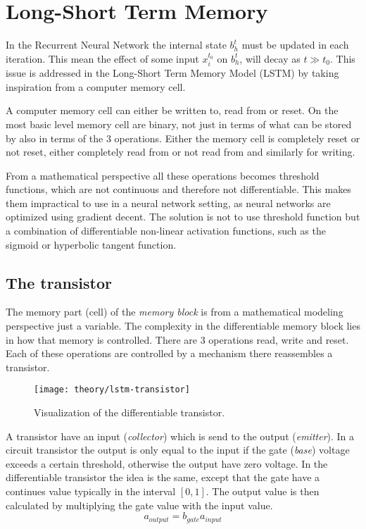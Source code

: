
\section{Long-Short Term Memory}

In the Recurrent Neural Network the internal state $b_h^t$ must be updated in each iteration. This mean the effect of some input $x_i^{t_0}$ on $b_h^{t}$, will decay as $t \gg t_0$. This issue is addressed in the Long-Short Term Memory Model (LSTM) by taking inspiration from a computer memory cell.

A computer memory cell can either be written to, read from or reset. On the most basic level memory cell are binary, not just in terms of what can be stored by also in terms of the 3 operations. Either the memory cell is completely reset or not reset, either completely read from or not read from and similarly for writing.

From a mathematical perspective all these operations becomes threshold functions, which are not continuous and therefore not differentiable. This makes them impractical to use in a neural network setting, as neural networks are optimized using gradient decent. The solution is not to use threshold function but a combination of differentiable non-linear activation functions, such as the sigmoid or hyperbolic tangent function.

\subsection{The transistor}

The memory part (cell) of the \textit{memory block} is from a mathematical modeling perspective just a variable. The complexity in the differentiable memory block lies in how that memory is controlled. There are 3 operations read, write and reset. Each of these operations are controlled by a mechanism there reassembles a transistor.

\begin{figure}[h]
	\centering
	\texttt{[image: theory/lstm-transistor]}
	\caption{Visualization of the differentiable transistor.}
	\label{fig:theory:lstm:lstm-transistor}
\end{figure}

A transistor have an input (\textit{collector}) which is send to the output (\textit{emitter}). In a circuit transistor the output is only equal to the input if the gate (\textit{base}) voltage exceeds a certain threshold, otherwise the output have zero voltage. In the differentiable transistor the idea is the same, except that the gate have a continues value typically in the interval $[0, 1]$. The output value is then calculated by multiplying the gate value with the input value.
\begin{equation}
a_{output} = b_{gate} a_{input}
\end{equation}

